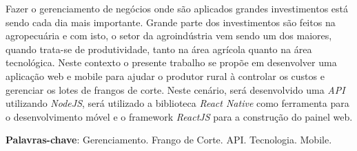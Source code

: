 
\begin{resumo}[RESUMO]
\begin{SingleSpacing}


Fazer o gerenciamento de negócios onde são aplicados grandes investimentos está sendo cada dia mais importante. Grande parte dos investimentos são feitos na agropecuária e com isto, o setor da agroindústria vem sendo um dos maiores, quando trata-se de produtividade, tanto na área agrícola quanto na área tecnológica. Neste contexto o presente trabalho se propõe em  desenvolver uma aplicação web e mobile para ajudar o produtor rural à controlar os custos e gerenciar os lotes de frangos de corte. Neste cenário, será desenvolvido uma \textit{API} utilizando \textit{NodeJS}, será utilizado a biblioteca \textit{React Native} como ferramenta para o desenvolvimento móvel e o framework \textit{ReactJS} para a construção do painel web. 


\textbf{Palavras-chave}: Gerenciamento. Frango de Corte. API. Tecnologia. Mobile.

\end{SingleSpacing}
\end{resumo}

